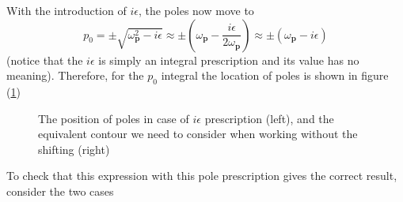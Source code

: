 \documentclass[11pt]{article}
\newcommand{\w}{\omega}
\numberwithin{equation}{section}
\begin{document}
    With the introduction of \(i\epsilon\), the poles now move to 
    \begin{equation*}
        p_0 = \pm \sqrt{\w_\textbf{p}^2 - i\epsilon} \approx \pm \left( \w_\textbf{p} - \frac{i\epsilon}{2\w_\textbf{p}} \right) \approx \pm (\w_\textbf{p} - i\epsilon)
    \end{equation*}
    (notice that the \(i\epsilon\) is simply an integral prescription and its value has no meaning). Therefore, for the \(p_0\) integral the location of poles is shown in figure (\ref{fig:prescription})
    \begin{figure}[h]
        \centering
        \caption{The position of poles in case of \(i\epsilon\) prescription (left), and the equivalent contour we need to consider when working without the shifting (right)}\label{fig:prescription}
    \end{figure}

    To check that this expression with this pole prescription gives the correct result, consider the two cases\\
\end{document}
